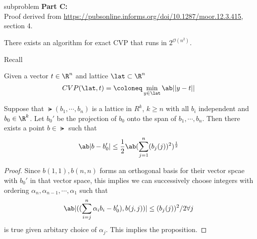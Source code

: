 \documentclass[12pt]{amsart}
\begin{document}
\begin{problem}
\begin{subproblem}
subproblem    \textbf{Part C:}\\
      Proof derived from \href{https://pubsonline.informs.org/doi/10.1287/moor.12.3.415}{https://pubsonline.informs.org/doi/10.1287/moor.12.3.415}, section 4. 

    \begin{claim}
      There exists an algorithm for exact CVP that runs in $2^{\mathcal{O}(n^2)}$.
    \end{claim}
    Recall 
    \begin{definition}[CVP]
      Given a vector $t\in\R^n$ and lattice $\lat\subset \R^n$ 
      \[CVP(\lat, t) = \coloneq \min_{y\in\lat}\ab||y-t||\]

    \end{definition}
    \begin{proposition}
      Suppose that $\lat(b_1,\cdots,b_n)$ is a lattice in $R^{k}$, $k\geq n$ with all $b_i$ independent and $b_0\in \R^k$. Let $b_0'$ be the projection of $b_0$ onto the span of $b_1,\cdots,b_n$. Then there exists a point $b\in\lat$ such that
      \[\ab|b-b_0'| \leq \frac12 \ab(\sum_{j=1}^n (b_j(j))^2)^\frac12\]
    \end{proposition}
    \begin{proof}
      Since $b(1,1), b(n,n)$ forms an orthogonal basis for their vector spcae with $b_0'$ in that vector space, this implies we can successively choose integers with ordering $\alpha_n, \alpha_{n-1},\cdots,\alpha_1$ such that 
      \[\ab|((\sum_{i=j}^n\alpha_ib_i-b_0'), b(j,j))|\leq (b_j(j))^2/2\forall j\]
      is true given arbitary choice of $\alpha_j$. This implies the proposition. 
    \end{proof}


\end{subproblem}
\end{problem}
\end{document}
